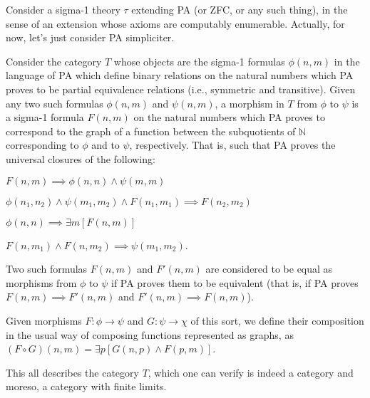 \begin{construction}\label{Sigma1Model}

Consider a sigma-1 theory $\tau$ extending PA (or ZFC, or any such thing), in the sense of an extension whose axioms are computably enumerable. Actually, for now, let's just consider PA simpliciter.


Consider the category $T$ whose objects are the sigma-1 formulas $\phi(n, m)$ in the language of PA which define binary relations on the natural numbers which PA proves to be partial equivalence relations (i.e., symmetric and transitive). Given any two such formulas $\phi(n, m)$ and $\psi(n, m)$, a morphism in $T$ from $\phi$ to $\psi$ is a sigma-1 formula $F(n, m)$ on the natural numbers which PA proves to correspond to the graph of a function between the subquotients of $\mathbb{N}$ corresponding to $\phi$ and to $\psi$, respectively. That is, such that PA proves the universal closures of the following:

$F(n, m) \implies \phi(n, n) \wedge \psi(m, m)$

$\phi(n_1, n_2) \wedge \psi(m_1, m_2) \wedge F(n_1, m_1) \implies F(n_2, m_2)$

$\phi(n, n) \implies \exists m [F(n, m)]$

$F(n, m_1) \wedge F(n, m_2) \implies \psi(m_1, m_2)$.

Two such formulas $F(n, m)$ and $F'(n, m)$ are considered to be equal as morphisms from $\phi$ to $\psi$ if PA proves them to be equivalent (that is, if PA proves $F(n, m) \implies F'(n, m)$ and $F'(n, m) \implies F(n, m)$).

Given morphisms $F : \phi \to \psi$ and $G: \psi \to \chi$ of this sort, we define their composition in the usual way of composing functions represented as graphs, as $(F \circ G)(n, m) = \exists p [G(n, p) \wedge F(p, m)]$.

This all describes the category $T$, which one can verify is indeed a category and moreso, a category with finite limits.



\end{construction}
